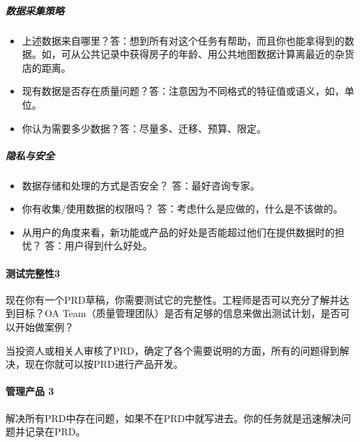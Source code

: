 \documentclass[letterpaper,10pt,english]{sphinxmanual}
\begin{document}
\subparagraph{数据采集策略}
\label{\detokenize{chapter_knowledge/PRD:id23}}\begin{itemize}
\item {} 
上述数据来自哪里？答：想到所有对这个任务有帮助，而且你也能拿得到的数据。如，可从公共记录中获得房子的年龄、用公共地图数据计算离最近的杂货店的距离。

\item {} 
现有数据是否存在质量问题？答：注意因为不同格式的特征值或语义，如，单位。

\item {} 
你认为需要多少数据？答：尽量多、迁移、预算、限定。

\end{itemize}


\subparagraph{隐私与安全}
\label{\detokenize{chapter_knowledge/PRD:id24}}\begin{itemize}
\item {} 
数据存储和处理的方式是否安全？ 答：最好咨询专家。

\item {} 
你有收集/使用数据的权限吗？ 答：考虑什么是应做的，什么是不该做的。

\item {} 
从用户的角度来看，新功能或产品的好处是否能超过他们在提供数据时的担忧？
答：用户得到什么好处。

\end{itemize}


\paragraph{测试完整性3\sphinxfootnotemark[571]}
\label{\detokenize{chapter_knowledge/PRD:id25}}%
\begin{footnotetext}[571]\sphinxAtStartFootnote
{}
%
\end{footnotetext}\ignorespaces 
现在你有一个PRD草稿，你需要测试它的完整性。工程师是否可以充分了解并达到目标？OA
Team（质量管理团队）是否有足够的信息来做出测试计划，是否可以开始做案例？

当投资人或相关人审核了PRD，确定了各个需要说明的方面，所有的问题得到解决，现在你就可以按PRD进行产品开发。


\paragraph{管理产品 3\sphinxfootnotemark[572]}
\label{\detokenize{chapter_knowledge/PRD:id26}}%
\begin{footnotetext}[572]\sphinxAtStartFootnote
{}
%
\end{footnotetext}\ignorespaces 
解决所有PRD中存在问题，如果不在PRD中就写进去。你的任务就是迅速解决问题并记录在PRD。
\end{document}
